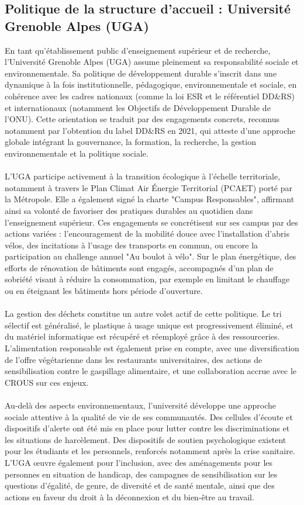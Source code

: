 \documentclass[12pt]{article}
\begin{document}
\subsection{Politique de la structure d'accueil : Université Grenoble Alpes (UGA)}
En tant qu’établissement public d’enseignement supérieur et de recherche, l’Université Grenoble Alpes (UGA) assume pleinement sa responsabilité sociale et environnementale. Sa politique de développement durable s’inscrit dans une dynamique à la fois institutionnelle, pédagogique, environnementale et sociale, en cohérence avec les cadres nationaux (comme la loi ESR et le référentiel DD\&RS) et internationaux (notamment les Objectifs de Développement Durable de l’ONU). Cette orientation se traduit par des engagements concrets, reconnus notamment par l’obtention du label DD\&RS en 2021, qui atteste d’une approche globale intégrant la gouvernance, la formation, la recherche, la gestion environnementale et la politique sociale.\\
\\
L’UGA participe activement à la transition écologique à l’échelle territoriale, notamment à travers le Plan Climat Air Énergie Territorial (PCAET) porté par la Métropole. Elle a également signé la charte "Campus Responsables", affirmant ainsi sa volonté de favoriser des pratiques durables au quotidien dans l’enseignement supérieur. Ces engagements se concrétisent sur ses campus par des actions variées : l’encouragement de la mobilité douce avec l’installation d’abris vélos, des incitations à l’usage des transports en commun, ou encore la participation au challenge annuel "Au boulot à vélo". Sur le plan énergétique, des efforts de rénovation de bâtiments sont engagés, accompagnés d’un plan de sobriété visant à réduire la consommation, par exemple en limitant le chauffage ou en éteignant les bâtiments hors période d’ouverture.\\
\\
La gestion des déchets constitue un autre volet actif de cette politique. Le tri sélectif est généralisé, le plastique à usage unique est progressivement éliminé, et du matériel informatique est récupéré et réemployé grâce à des ressourceries. L’alimentation responsable est également prise en compte, avec une diversification de l’offre végétarienne dans les restaurants universitaires, des actions de sensibilisation contre le gaspillage alimentaire, et une collaboration accrue avec le CROUS sur ces enjeux.\\
\\
Au-delà des aspects environnementaux, l’université développe une approche sociale attentive à la qualité de vie de ses communautés. Des cellules d’écoute et dispositifs d’alerte ont été mis en place pour lutter contre les discriminations et les situations de harcèlement. Des dispositifs de soutien psychologique existent pour les étudiants et les personnels, renforcés notamment après la crise sanitaire. L’UGA œuvre également pour l’inclusion, avec des aménagements pour les personnes en situation de handicap, des campagnes de sensibilisation sur les questions d’égalité, de genre, de diversité et de santé mentale, ainsi que des actions en faveur du droit à la déconnexion et du bien-être au travail.\\
\end{document}
